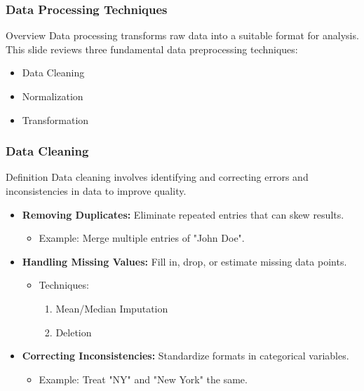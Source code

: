 \documentclass{beamer}
\begin{document}
\begin{frame}[fragile]
    \frametitle{Data Processing Techniques}
    \begin{block}{Overview}
        Data processing transforms raw data into a suitable format for analysis. This slide reviews three fundamental data preprocessing techniques: 
        \begin{itemize}
            \item Data Cleaning
            \item Normalization
            \item Transformation
        \end{itemize}
    \end{block}
\end{frame}

\begin{frame}[fragile]
    \frametitle{Data Cleaning}
    \begin{block}{Definition}
        Data cleaning involves identifying and correcting errors and inconsistencies in data to improve quality.
    \end{block}
    \begin{itemize}
        \item \textbf{Removing Duplicates:} Eliminate repeated entries that can skew results.
        \begin{itemize}
            \item Example: Merge multiple entries of "John Doe".
        \end{itemize}
        \item \textbf{Handling Missing Values:} Fill in, drop, or estimate missing data points.
        \begin{itemize}
            \item Techniques:
            \begin{enumerate}
                \item Mean/Median Imputation
                \item Deletion
            \end{enumerate}
        \end{itemize}
        \item \textbf{Correcting Inconsistencies:} Standardize formats in categorical variables.
        \begin{itemize}
            \item Example: Treat "NY" and "New York" the same.
        \end{itemize}
    \end{itemize}
\end{frame}
\end{document}
